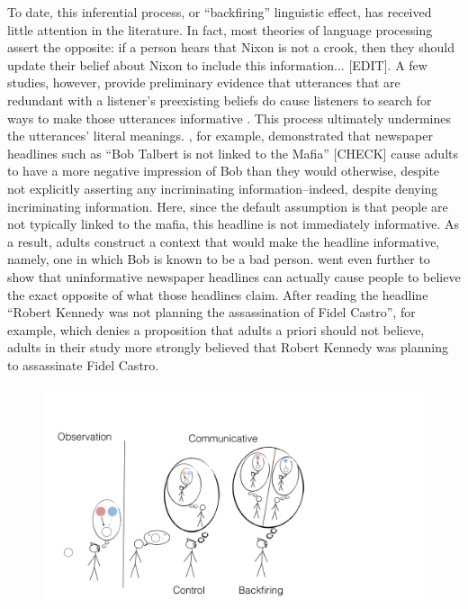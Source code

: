 \documentclass[10pt,letterpaper]{article}
\begin{document}
To date, this inferential process, or “backfiring” linguistic effect, has received little attention in the literature.  In fact, most theories of language processing assert the opposite: if a person hears that Nixon is not a crook, then they should update their belief about Nixon to include this information... [EDIT].  A few studies, however, provide preliminary evidence that utterances that are redundant with a listener’s preexisting beliefs do cause listeners to search for ways to make those utterances informative \cite{Yandell1979, Wegner1981, Gruenfeld1992, Kravtchenko2015}.  This process ultimately undermines the utterances’ literal meanings.  
, for example, demonstrated that newspaper headlines such as “Bob Talbert is not linked to the Mafia” [CHECK] cause adults to have a more negative impression of Bob than they would otherwise, despite not explicitly asserting any incriminating information--indeed, despite denying incriminating information.  Here, since the default assumption is that people are not typically linked to the mafia, this headline is not immediately informative.  As a result, adults construct a context that would make the headline informative, namely, one in which Bob is known to be a bad person.  
 went even further to show that uninformative newspaper headlines can actually cause people to believe the exact opposite of what those headlines claim.  After reading the headline “Robert Kennedy was not planning the assassination of Fidel Castro”, for example, which denies a proposition that adults a priori should not believe, adults in their study more strongly believed that Robert Kennedy was planning to assassinate Fidel Castro.


\begin{figure}
\centering
    \includegraphics[width=\columnwidth]{cartoon}
    \caption{}
  \label{fig:cartoon}
\end{figure}
\end{document}
